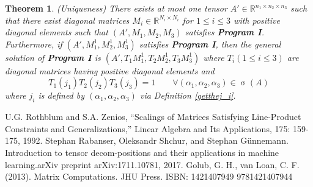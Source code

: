 \documentclass{article}
\newtheorem{theorem}{Theorem}[section]
\begin{document}
\begin{theorem}{(Uniqueness)} There exists at most one tensor $A' \in \mathbb{R}^{n_1\times n_2\times n_3}$ such that there exist diagonal matrices $M_i \in \mathbb{R}^{N_i\times N_i}$ for $1 \leq i \leq 3$ with positive diagonal elements such that $(A', M_1, M_2, M_3)$ satisfies \textbf{Program I}. Furthermore, if $(A', M_1^1, M_2^1, M_3^1)$ satisfies \textbf{Program I}, then the general solution of \textbf{Program I} is $(A', T_1M_1^1, T_2M_2^1, T_3M_3^1)$ where $T_i (1\leq i\leq 3)$ are diagonal matrices having positive diagonal elements and
\begin{equation}
    T_1(j_1)T_2(j_2)T_3(j_3) = 1 \qquad \forall (\alpha_1, \alpha_2, \alpha_3)  \in \upsigma(A)
\end{equation}{}
where $j_i$ is defined by $(\alpha_1, \alpha_2, \alpha_3)$ via Definition \ref{getthej_i}. 


\end{theorem}{}





\begin{thebibliography}{9}
 U.G. Rothblum and S.A. Zenios, “Scalings of Matrices Satisfying Line-Product Constraints and Generalizations,”
Linear Algebra and Its Applications, 175: 159-175, 1992.
 Stephan Rabanser, Oleksandr Shchur, and Stephan Günnemann. Introduction to tensor decom-positions and their applications in machine learning.arXiv preprint arXiv:1711.10781, 2017.
  Golub, G. H., van Loan, C. F. (2013). Matrix Computations. JHU Press. ISBN: 1421407949 9781421407944 


\end{thebibliography}
\end{document}
